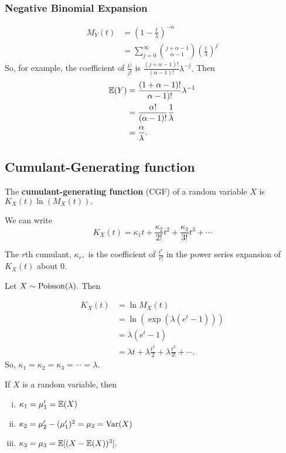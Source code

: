 \subsubsection{Negative Binomial Expansion}
\begin{align*}
    M_Y(t)&=\left(1-\frac{t}{\lambda}\right)^{-\alpha} \\
    &=\sum^\infty_{j=0}\binom{j+\alpha-1}{\alpha-1}\left(\frac{t}{\lambda}\right)^j 
\end{align*}
So, for example, the coefficient of $\frac{t^j}{j!}$ is $\frac{(j+\alpha-1)!}{(\alpha-1)!}\lambda^{-j}.$ Then
\begin{align*}
    \mathbb E(Y)&=\frac{(1+\alpha-1)!}{\alpha-1)!}\lambda^{-1} \\
    &=\frac{\alpha!}{(\alpha-1)!}\frac{1}{\lambda}\\
    &=\frac{\alpha}{\lambda}.
\end{align*}

\subsection{Cumulant-Generating function}

\begin{definition}
The \textbf{cumulant-generating function} (CGF) of a random variable $X$ is $K_X(t)\ln(M_X(t)).$
\end{definition}

We can write
$$
K_X(t)=\kappa_1 t +\frac{\kappa_2}{2!}t^2+\frac{\kappa_3}{3!}t^3+\cdots
$$

The $r$th cumulant, $\kappa_r,$ is the coefficient of $\frac{t^r}{r!}$ in the power series expansion of $K_X(t)$ about 0.

\begin{eg}
Let $X\sim \operatorname*{Poisson}(\lambda).$ Then

\begin{align*}
    K_X(t)&=\ln M_X(t) \\
    &=\ln(\exp(\lambda(e^t-1))) \\
    &=\lambda(e^t-1) \\
    &=\lambda t +\lambda \frac{t^2}{2} +\lambda \frac{t^3}{3!}+\cdots.
\end{align*}
So, $\kappa_1=\kappa_2=\kappa_3=\cdots=\lambda.$
\end{eg}

\begin{prop}
If $X$ is a random variable, then
\begin{enumerate}[i.]
    \item $\kappa_1=\mu'_1=\mathbb E(X)$
    \item $\kappa_2=\mu'_2-(\mu_1')^2=\mu_2=\operatorname*{Var}(X)$
    \item $\kappa_3=\mu_3=\mathbb E[(X-\mathbb E(X))^3].$
\end{enumerate}
\end{prop}

